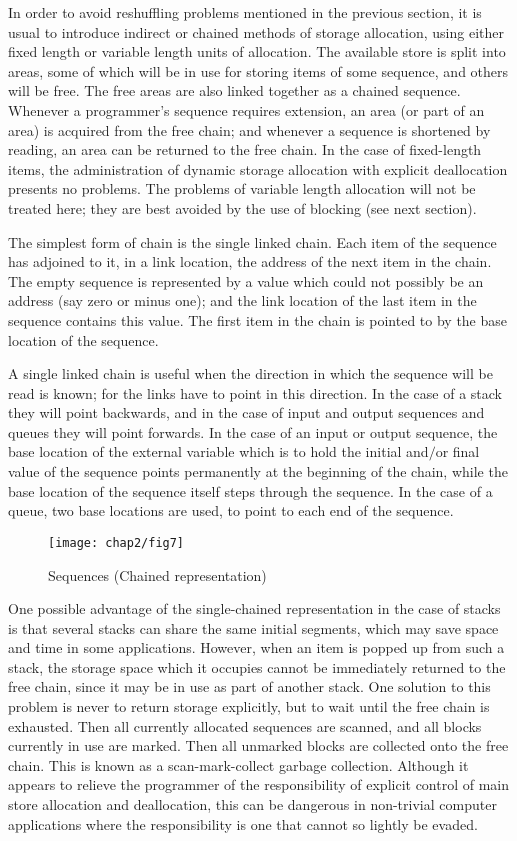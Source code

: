 In order to avoid reshuffling problems mentioned in the previous section, it is usual to introduce indirect or chained methods of storage allocation, using either fixed length or variable length units of allocation. The available store is split into areas, some of which will be in use for storing items of some sequence, and others will be free. The free areas are also linked together as a chained sequence. Whenever a programmer's sequence requires extension, an area (or part of an area) is acquired from the free chain; and whenever a sequence is shortened by reading, an area can be returned to the free chain. In the case of fixed-length items, the administration of dynamic storage allocation with explicit deallocation presents no problems. The problems of variable length allocation will not be treated here; they are best avoided by the use of blocking (see next section).

The simplest form of chain is the single linked chain. Each item of the sequence has adjoined to it, in a link location, the address of the next item in the chain. The empty sequence is represented by a value which could not possibly be an address (say zero or minus one); and the link location of the last item in the sequence contains this value. The first item in the chain is pointed to by the base location of the sequence.

A single linked chain is useful when the direction in which the sequence will be read is known; for the links have to point in this direction. In the case of a stack they will point backwards, and in the case of input and output sequences and queues they will point forwards. In the case of an input or output sequence, the base location of the external variable which is to hold the initial and$/$or final value of the sequence points permanently at the beginning of the chain, while the base location of the sequence itself steps through the sequence. In the case of a queue, two base locations are used, to point to each end of the sequence.

\begin{figure}[h]
	\centering
	\texttt{[image: chap2/fig7]}
	\caption{Sequences (Chained representation)}
\end{figure}

One possible advantage of the single-chained representation in the case of stacks is that several stacks can share the same initial segments, which may save space and time in some applications. However, when an item is popped up from such a stack, the storage space which it occupies cannot be immediately returned to the free chain, since it may be in use as part of another stack. One solution to this problem is never to return storage explicitly, but to wait until the free chain is exhausted. Then all currently allocated sequences are scanned, and all blocks currently in use are marked. Then all unmarked blocks are collected onto the free chain. This is known as a scan-mark-collect garbage collection. Although it appears to relieve the programmer of the responsibility of explicit control of main store allocation and deallocation, this can be dangerous in non-trivial computer applications where the responsibility is one that cannot so lightly be evaded.

